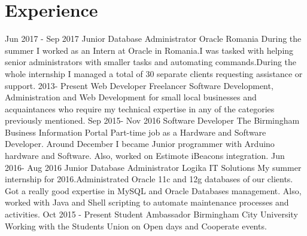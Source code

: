 \documentclass[]{friggeri-cv}
\begin{document}
\section{Experience}
\begin{entrylist}
    \entry
  {Jun 2017 - Sep 2017}
  {Junior Database Administrator}
  {Oracle Romania}
  {During the summer I worked as an Intern at Oracle in Romania.I was tasked with helping senior administrators with smaller tasks and automating commands.During the whole internship I managed a total of 30 separate clients requesting assistance or support.}
  \entry
  {2013- Present}
  {Web Developer}
  {Freelancer}
  {Software Development, Administration and Web Development for small local businesses and acquaintances who require my technical expertise in any of the categories previously mentioned.}
  \entry
  {Sep 2015- Nov 2016}
  {Software Developer}
  {The Birmingham Business Information Portal}
  {Part-time job as a Hardware and Software Developer. Around December I became Junior programmer with Arduino hardware and Software. Also, worked on Estimote iBeacons integration.}
  \entry
  {Jun 2016- Aug 2016}
  {Junior Database Administrator}
  {Logika IT Solutions}
  {My summer internship for 2016.Administrated Oracle 11c and 12g databases of our clients. Got a really good expertise in MySQL and Oracle Databases management. Also, worked with Java and Shell scripting to automate maintenance processes and activities.}
  \entry
  {Oct 2015 - Present}
  {Student Ambassador}
  {Birmingham City University}
  {Working with the Students Union on Open days and Cooperate events.}
\end{entrylist}
\\
\end{document}
